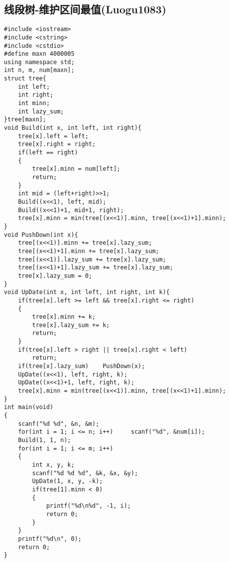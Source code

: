 \documentclass[UTF8]{ctexart}
\begin{document}
	\subsection{线段树-维护区间最值(Luogu1083)}
	{\setmainfont{Consolas}
\begin{lstlisting}
#include <iostream>
#include <cstring>
#include <cstdio>
#define maxn 4000005
using namespace std;
int n, m, num[maxn];
struct tree{
	int left;
	int right;
	int minn;
	int lazy_sum;
}tree[maxn];
void Build(int x, int left, int right){
	tree[x].left = left;
	tree[x].right = right;
	if(left == right)
	{
		tree[x].minn = num[left];
		return;
	}
	int mid = (left+right)>>1;
	Build((x<<1), left, mid);
	Build((x<<1)+1, mid+1, right);
	tree[x].minn = min(tree[(x<<1)].minn, tree[(x<<1)+1].minn);
}
void PushDown(int x){
	tree[(x<<1)].minn += tree[x].lazy_sum;
	tree[(x<<1)+1].minn += tree[x].lazy_sum;
	tree[(x<<1)].lazy_sum += tree[x].lazy_sum;
	tree[(x<<1)+1].lazy_sum += tree[x].lazy_sum;
	tree[x].lazy_sum = 0;
}
void UpDate(int x, int left, int right, int k){
	if(tree[x].left >= left && tree[x].right <= right)
	{
		tree[x].minn += k;
		tree[x].lazy_sum += k;
		return;
	}
	if(tree[x].left > right || tree[x].right < left)
		return;
	if(tree[x].lazy_sum)	PushDown(x);
	UpDate((x<<1), left, right, k);
	UpDate((x<<1)+1, left, right, k);
	tree[x].minn = min(tree[(x<<1)].minn, tree[(x<<1)+1].minn);
}
int main(void)
{
	scanf("%d %d", &n, &m);
	for(int i = 1; i <= n; i++)		scanf("%d", &num[i]);
	Build(1, 1, n);
	for(int i = 1; i <= m; i++)
	{
		int x, y, k;
		scanf("%d %d %d", &k, &x, &y);
		UpDate(1, x, y, -k);
		if(tree[1].minn < 0)
		{
			printf("%d\n%d", -1, i);
			return 0;
		}
	}
	printf("%d\n", 0);
	return 0;
} 
\end{lstlisting}}
\newpage
\end{document}

